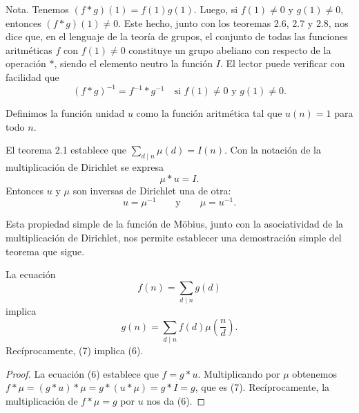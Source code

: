 \documentclass[12pt,a4paper]{book}
\begin{document}
    Nota. Tenemos $(f*g)(1)=f(1)g(1)$. Luego, si $f(1)\neq0$ y $g(1)\neq0$, entonces
    $(f*g)(1)\neq0$. Este hecho, junto con los teoremas 2.6, 2.7 y 2.8, nos dice que, en el
    lenguaje de la teoría de grupos, el conjunto de todas las funciones aritméticas $f$ con
    $f(1)\neq0$ constituye un grupo abeliano con respecto de la operación $*$, siendo el
    elemento neutro la función $I$. El lector puede verificar con facilidad que
    \begin{equation*}
        (f*g)^{-1}=f^{-1}*g^{-1}\quad\text{si } f(1)\neq0 \text{ y } g(1)\neq0.
    \end{equation*}

    \begin{definicion}
        Definimos la función unidad $u$ como la función aritmética tal que $u(n)=1$ para
        todo $n$.
    \end{definicion}

    El teorema 2.1 establece que $\sum_{d\mid n}\mu(d)=I(n)$. Con la notación de la
    multiplicación de Dirichlet se expresa
    \begin{equation*}
        \mu*u=I.
    \end{equation*}
    Entonces $u$ y $\mu$ son inversas de Dirichlet una de otra:
    \begin{equation*}
        u=\mu^{-1}\qquad\text{y}\qquad \mu=u^{-1}.
    \end{equation*}

    Esta propiedad simple de la función de Möbius, junto con la asociatividad de la
    multiplicación de Dirichlet, nos permite establecer una demostración simple del teorema
    que sigue.

    \begin{teorema}
        La ecuación
        \begin{equation}
            f(n)=\sum_{d\mid n}g(d)
        \end{equation}
        implica
        \begin{equation}
            g(n)=\sum_{d\mid n}f(d)\mu\left(\frac{n}{d}\right).
        \end{equation}
        Recíprocamente, (7) implica (6).
    \end{teorema}

    \begin{proof}
        La ecuación (6) establece que $f=g*u$. Multiplicando por $\mu$ obtenemos
        $f*\mu=(g*u)*\mu=g*(u*\mu)=g*I=g$, que es (7). Recíprocamente, la multiplicación de
        $f*\mu=g$ por $u$ nos da (6).
    \end{proof}
\end{document}

